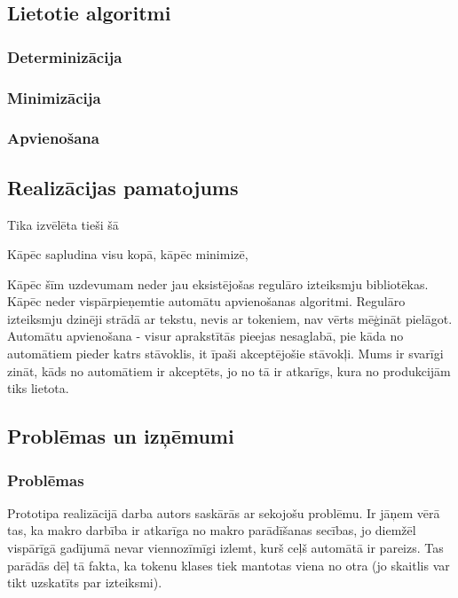 \subsection{Lietotie algoritmi}
\label{subsec:solution_algorithms}

\subsubsection{Determinizācija}

\subsubsection{Minimizācija}

\subsubsection{Apvienošana}

\subsection{Realizācijas pamatojums}
\label{subsec:solution_motivation}

Tika izvēlēta tieši šā

Kāpēc sapludina visu kopā, kāpēc minimizē, 


Kāpēc šīm uzdevumam neder jau eksistējošas regulāro izteiksmju bibliotēkas. Kāpēc  neder vispārpieņemtie automātu apvienošanas algoritmi.
Regulāro izteiksmju dzinēji strādā ar tekstu, nevis ar tokeniem, nav vērts mēģināt pielāgot. Automātu apvienošana - visur aprakstītās pieejas nesaglabā, pie kāda no automātiem pieder katrs stāvoklis, it īpaši akceptējošie stāvokļi. Mums ir svarīgi zināt, kāds no automātiem ir akceptēts, jo no tā ir atkarīgs, kura no produkcijām tiks lietota. 

\subsection{Problēmas un izņēmumi}
\label{subsec:solution_problems}
\subsubsection{Problēmas}
Prototipa realizācijā darba autors saskārās ar sekojošu problēmu. Ir jāņem vērā tas, ka makro darbība ir atkarīga no makro parādīšanas secības, jo diemžēl vispārīgā gadījumā nevar viennozīmīgi izlemt, kurš ceļš automātā ir pareizs. Tas parādās dēļ tā fakta, ka tokenu klases tiek mantotas viena no otra (jo skaitlis var tikt uzskatīts par izteiksmi). 

